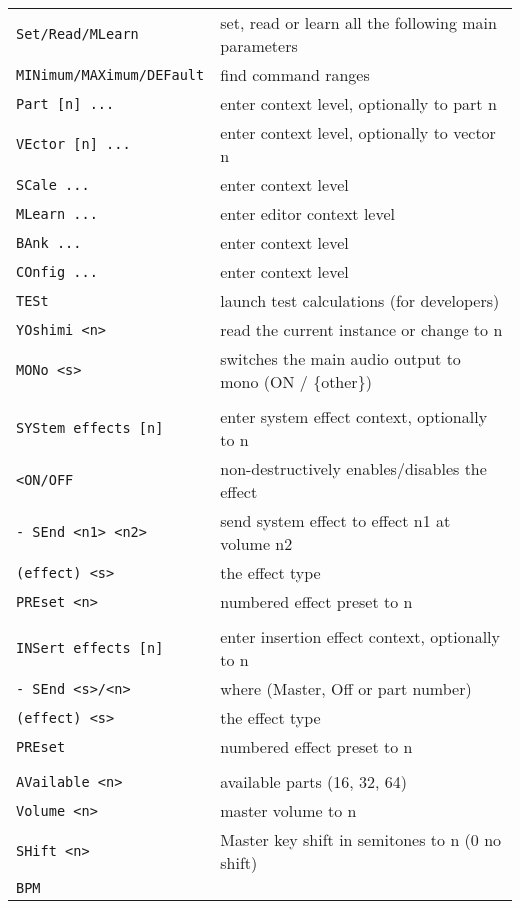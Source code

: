 \begin{center}
\begin{longtable}{p{6cm} p{10cm}}
\texttt{Set/Read/MLearn} &
   set, read or learn all the following main parameters \\
\texttt{MINimum/MAXimum/DEFault} &
   find command ranges \\
   \texttt{Part [n] ...} &
   enter context level, optionally to part n \\
\texttt{VEctor [n] ...} &
   enter context level, optionally to vector n \\
\texttt{SCale ...} &
   enter context level \\
\texttt{MLearn ...} &
   enter editor context level \\
\texttt{BAnk ...} &
   enter context level \\
\texttt{COnfig ...} &
   enter context level \\
\texttt{TESt} &
   launch test calculations (for developers) \\
\texttt{YOshimi <n>} &
   read the current instance or change to n \\
\texttt{MONo <s>} &
   switches the main audio output to mono (ON / \{other\}) \\
\texttt{} & \\ %
\texttt{SYStem effects [n]} &
   enter system effect context, optionally to n \\
\texttt{<ON/OFF} &
   non-destructively enables/disables the effect \\
\texttt{- SEnd <n1> <n2>} &
   send system effect to effect n1 at volume n2 \\
\texttt{(effect) <s>} &
   the effect type \\
\texttt{PREset <n>} &
   numbered effect preset to n \\
\texttt{} & \\ %
\texttt{INSert effects [n]} &
   enter insertion effect context, optionally to n \\
\texttt{- SEnd <s>/<n>} &
   where (Master, Off or part number) \\
\texttt{(effect) <s>} &
   the effect type \\
\texttt{PREset} &
   numbered effect preset to n \\
\texttt{} & \\ %
\texttt{AVailable <n>} &
   available parts (16, 32, 64) \\
\texttt{Volume <n>} &
   master volume to n \\
\texttt{SHift <n>} &
   Master key shift in semitones to n (0 no shift) \\
\texttt{BPM} &

\end{longtable}
\end{center}
